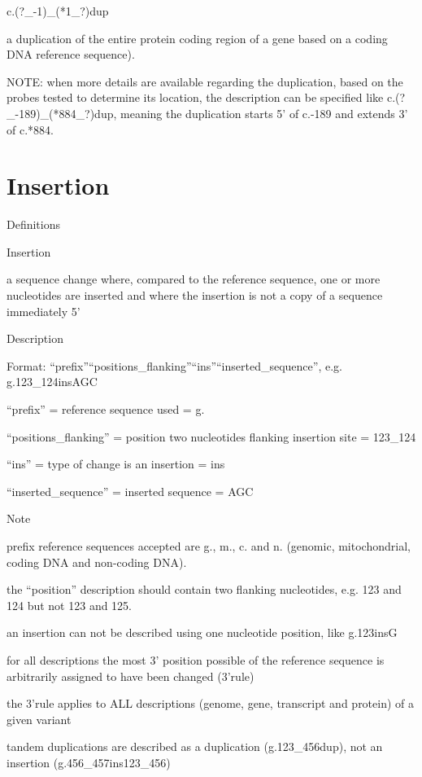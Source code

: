 \documentclass{book}
\begin{document}
	c.(?\_-1)\_(*1\_?)dup

	a duplication of the entire protein coding region of a gene based on a coding DNA reference sequence).

	NOTE: when more details are available regarding the duplication, based on the probes tested to determine its location, the description can be specified like c.(?\_-189)\_(*884\_?)dup, meaning the duplication starts 5’ of c.-189 and extends 3’ of c.*884.

	

	\section{Insertion}

	Definitions

	Insertion

	a sequence change where, compared to the reference sequence, one or more nucleotides are inserted and where the insertion is not a copy of a sequence immediately 5'

	

	

	Description

	Format: “prefix”“positions\_flanking”“ins”“inserted\_sequence”, e.g. g.123\_124insAGC

	“prefix” = reference sequence used = g.

	“positions\_flanking” = position two nucleotides flanking insertion site = 123\_124

	“ins” = type of change is an insertion = ins

	“inserted\_sequence” = inserted sequence = AGC

	

	Note

	prefix reference sequences accepted are g., m., c. and n. (genomic, mitochondrial, coding DNA and non-coding DNA).

	the “position” description should contain two flanking nucleotides, e.g. 123 and 124 but not 123 and 125.

	an insertion can not be described using one nucleotide position, like g.123insG

	for all descriptions the most 3’ position possible of the reference sequence is arbitrarily assigned to have been changed (3’rule) 

	the 3’rule applies to ALL descriptions (genome, gene, transcript and protein) of a given variant

	tandem duplications are described as a duplication (g.123\_456dup), not an insertion (g.456\_457ins123\_456) 
\end{document}
